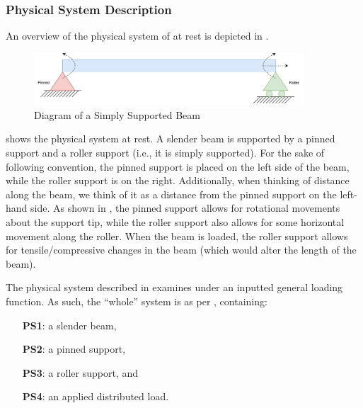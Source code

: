 \documentclass[12pt]{article}
\begin{document}
\subsubsection{Physical System Description}
\label{sec_phySystDescrip}

An overview of the physical system of \progname{} at rest is depicted in
.

\begin{figure}[H]
    \begin{center}
        \includegraphics[width=0.9\textwidth]{diagrams/beam_bending_diagram.drawio.pdf}
        \caption{\label{beam_bending_diagram} Diagram of a Simply Supported Beam}
    \end{center}
\end{figure}

 shows the physical system at rest. A slender beam is
supported by a pinned support and a roller support (i.e., it is simply
supported). For the sake of following convention, the pinned support is placed
on the left side of the beam, while the roller support is on the right.
Additionally, when thinking of distance along the beam, we think of it as a
distance from the pinned support on the left-hand side. As shown in
, the pinned support allows for rotational movements
about the support tip, while the roller support also allows for some horizontal
movement along the roller. When the beam is loaded, the roller support allows
for tensile/compressive changes in the beam (which would alter the length of the
beam).

The physical system described in \progname{} examines
 under an inputted general loading function. As such,
the ``whole'' system is as per ,
containing:

\begin{itemize}

    \item[\textbf{PS1}:] a slender beam,

    \item[\textbf{PS2}:] a pinned support,

    \item[\textbf{PS3}:] a roller support, and

    \item[\textbf{PS4}:] an applied distributed load.

\end{itemize}
\end{document}
